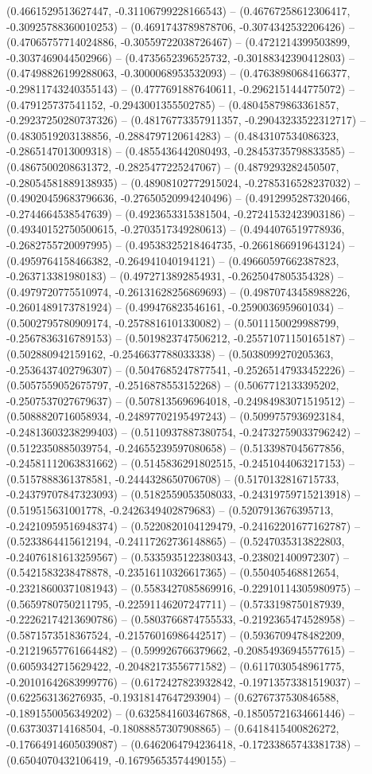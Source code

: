 (0.4661529513627447, -0.31106799228166543) -- (0.46767258612306417, -0.30925788360010253) -- (0.4691743789878706, -0.3074342532206426) -- (0.47065757714024886, -0.30559722038726467) -- (0.4721214399503899, -0.3037469044502966) -- (0.4735652396525732, -0.30188342390412803) -- (0.47498826199288063, -0.3000068953532093) -- (0.47638980684166377, -0.29811743240355143) -- (0.4777691887640611, -0.2962151444775072) -- (0.479125737541152, -0.2943001355502785) -- (0.48045879863361857, -0.29237250280737326) -- (0.48176773357911357, -0.29043233522312717) -- (0.4830519203138856, -0.2884797120614283) -- (0.4843107534086323, -0.2865147013009318) -- (0.4855436442080493, -0.28453735798833585) -- (0.4867500208631372, -0.2825477225247067) -- (0.4879293282450507, -0.28054581889138935) -- (0.48908102772915024, -0.2785316528237032) -- (0.49020459683796636, -0.27650520994240496) -- (0.4912995287320466, -0.2744664538547639) -- (0.4923653315381504, -0.27241532423903186) -- (0.49340152750500615, -0.2703517349280613) -- (0.4944076519778936, -0.2682755720097995) -- (0.49538325218464735, -0.2661866919643124) -- (0.4959764158466382, -0.264941040194121) -- (0.49660597662387823, -0.263713381980183) -- (0.4972713892854931, -0.2625047805354328) -- (0.4979720775510974, -0.26131628256869693) -- (0.49870743458988226, -0.2601489173781924) -- (0.499476823546161, -0.2590036959601034) -- (0.5002795780909174, -0.2578816101330082) -- (0.5011150029988799, -0.2567836316789153) -- (0.5019823747506212, -0.25571071150165187) -- (0.502880942159162, -0.2546637788033338) -- (0.5038099270205363, -0.2536437402796307) -- (0.5047685247877541, -0.25265147933452226) -- (0.5057559052675797, -0.2516878553152268) -- (0.5067712133395202, -0.2507537027679637) -- (0.5078135696964018, -0.24984983071519512) -- (0.5088820716058934, -0.24897702195497243) -- (0.5099757936923184, -0.24813603238299403) -- (0.5110937887380754, -0.24732759033796242) -- (0.5122350885039754, -0.24655239597080658) -- (0.5133987045677856, -0.24581112063831662) -- (0.5145836291802515, -0.2451044063217153) -- (0.5157888361378581, -0.2444328650706708) -- (0.5170132816715733, -0.24379707847323093) -- (0.5182559053508033, -0.24319759715213918) -- (0.519515631001778, -0.2426349402879683) -- (0.5207913676395713, -0.24210959516948374) -- (0.5220820104129479, -0.24162201677162787) -- (0.5233864415612194, -0.24117262736148865) -- (0.5247035313822803, -0.24076181613259567) -- (0.5335935122380343, -0.238021400972307) -- (0.5421583238478878, -0.23516110326617365) -- (0.550405468812654, -0.23218600371081943) -- (0.5583427085869916, -0.22910114305980975) -- (0.5659780750211795, -0.22591146207247711) -- (0.5733198750187939, -0.22262174213690786) -- (0.5803766874755533, -0.2192365474528958) -- (0.5871573518367524, -0.21576016986442517) -- (0.5936709478482209, -0.21219657761664482) -- (0.599926766379662, -0.20854936945577615) -- (0.6059342715629422, -0.20482173556771582) -- (0.6117030548961775, -0.20101642683999776) -- (0.6172427823932842, -0.19713573381519037) -- (0.622563136276935, -0.19318147647293904) -- (0.6276737530846588, -0.1891550056349202) -- (0.6325841603467868, -0.18505721634661446) -- (0.637303714168504, -0.18088857307908865) -- (0.6418415400826272, -0.17664914605039087) -- (0.6462064794236418, -0.17233865743381738) -- (0.6504070432106419, -0.16795653574490155) -- 
